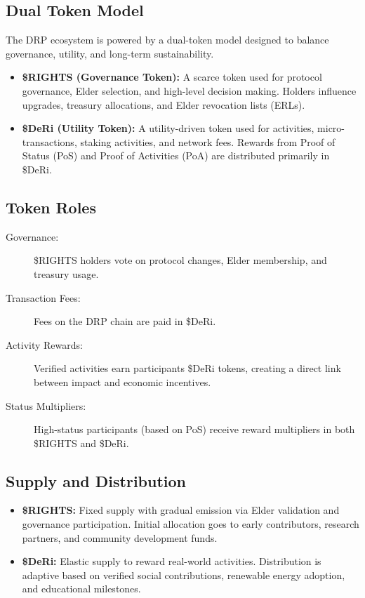 \documentclass[11pt,a4paper]{article}
\begin{document}
\subsection{Dual Token Model}
The DRP ecosystem is powered by a dual-token model designed to balance governance, utility, and long-term sustainability.

\begin{itemize}
    \item \textbf{\$RIGHTS (Governance Token):} A scarce token used for protocol governance, Elder selection, and high-level decision making. Holders influence upgrades, treasury allocations, and Elder revocation lists (ERLs).
    \item \textbf{\$DeRi (Utility Token):} A utility-driven token used for activities, micro-transactions, staking activities, and network fees. Rewards from Proof of Status (PoS\*) and Proof of Activities (PoA\*) are distributed primarily in \$DeRi.
\end{itemize}

\subsection{Token Roles}
\begin{description}
    \item[Governance:] \$RIGHTS holders vote on protocol changes, Elder membership, and treasury usage.
    \item[Transaction Fees:] Fees on the DRP chain are paid in \$DeRi.
    \item[Activity Rewards:] Verified activities earn participants \$DeRi tokens, creating a direct link between impact and economic incentives.
    \item[Status Multipliers:] High-status participants (based on PoS\*) receive reward multipliers in both \$RIGHTS and \$DeRi.
\end{description}

\subsection{Supply and Distribution}
\begin{itemize}
    \item \textbf{\$RIGHTS:} Fixed supply with gradual emission via Elder validation and governance participation. Initial allocation goes to early contributors, research partners, and community development funds.
    \item \textbf{\$DeRi:} Elastic supply to reward real-world activities. Distribution is adaptive based on verified social contributions, renewable energy adoption, and educational milestones.
\end{itemize}
\end{document}

